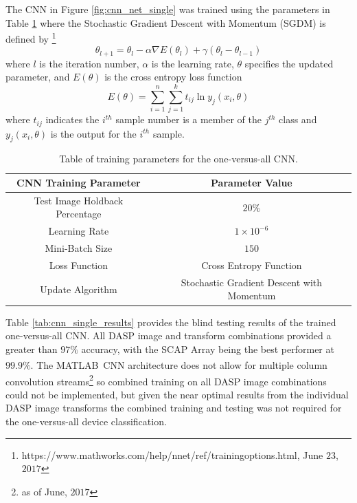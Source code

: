 The CNN in Figure \ref{fig:cnn_net_single} was trained using the parameters in Table \ref{tab:cnn_simple_train} where the Stochastic Gradient Descent with Momentum (SGDM) is defined by \footnote{https://www.mathworks.com/help/nnet/ref/trainingoptions.html, June $23$, $2017$}
\begin{equation}
    \theta_{l+1} = \theta_{l} - \alpha \nabla E \left(\theta_{l}\right) + \gamma \left( \theta_{l} - \theta_{l-1} \right)
		\label{eq:sgdmeq}
\end{equation}
where $l$ is the iteration number, $\alpha$ is the learning rate, $\theta$ specifies the updated parameter, and $E(\theta)$ is the cross entropy loss function
\begin{equation}
    E(\theta) = \sum^{n}_{i=1} \sum^{k}_{j=1} t_{ij} \ln y_{j} \left( x_{i},\theta \right)
		\label{eq:xentropyeq}
\end{equation}
 where $t_{ij}$ indicates the $i^{th}$ sample number is a member of the $j^{th}$ class and $y_{j}(x_{i},\theta)$ is the output for the $i^{th}$ sample.

\begin{table}[tb]
	\caption{Table of training parameters for the one-versus-all CNN.}
	\centering
		\begin{tabular}{c|c}
		\hline
		CNN Training Parameter & Parameter Value\\
		\hline
    Test Image Holdback Percentage & $20\%$ \\
		Learning Rate &  $1\times10^{-6}$\\
		Mini-Batch Size & $150$ \\
		Loss Function & Cross Entropy Function\\
		Update Algorithm & Stochastic Gradient Descent with Momentum\\
    \hline
		\end{tabular}
	\label{tab:cnn_simple_train}
\end{table}

Table \ref{tab:cnn_single_results} provides the blind testing results of the trained one-versus-all CNN.  All DASP image and transform combinations provided a greater than $97\%$ accuracy, with the SCAP Array being the best performer at $99.9\%$.  The MATLAB\textsuperscript \textregistered~CNN architecture does not allow for multiple column convolution streams\footnote{as of June, $2017$} so combined training on all DASP image combinations could not be implemented, but given the near optimal results from the individual DASP image transforms the combined training and testing was not required for the one-versus-all device classification.  

